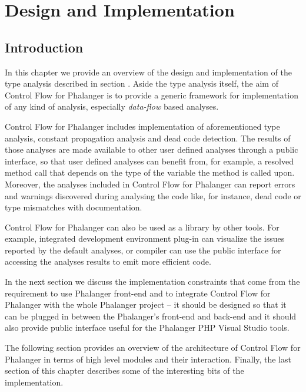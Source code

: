 \chapter{Design and Implementation}

    \section{Introduction}
    
    In this chapter we provide an overview of the design and 
    implementation of the type analysis described in 
    section . Aside the type analysis 
    itself, the aim of Control Flow for Phalanger is to provide 
    a generic framework for implementation of any kind 
    of analysis, especially \emph{data-flow} based analyses.
    
    Control Flow for Phalanger includes implementation of 
    aforementioned type analysis, constant propagation analysis 
    and dead code detection. The results of those analyses 
    are made available to other user defined analyses 
    through a public interface, so that user defined analyses 
    can benefit from, for example, a resolved method call 
    that depends on the type of the variable the method 
    is called upon. Moreover, the analyses included in 
    Control Flow for Phalanger can report errors and warnings 
    discovered during analysing the code like, for instance, 
    dead code or type mismatches with documentation.
    
    Control Flow for Phalanger can also be used as a 
    library by other tools. For example, integrated 
    development environment plug-in can visualize the 
    issues reported by the default analyses, or compiler 
    can use the public interface for accessing the 
    analyses results to emit more efficient code.
    
    In the next section we discuss the implementation 
    constraints that come from the requirement to use 
    Phalanger front-end and to integrate Control Flow 
    for Phalanger with the whole Phalanger project -- 
    it should be designed so that it can be plugged 
    in between the Phalanger's front-end and back-end 
    and it should also provide public interface useful 
    for the Phalanger PHP Visual Studio tools.
    
    The following section provides an overview of the 
    architecture of Control Flow for Phalanger in 
    terms of high level modules and their interaction. 
    Finally, the last section of this chapter describes 
    some of the interesting bits of the implementation.
    
